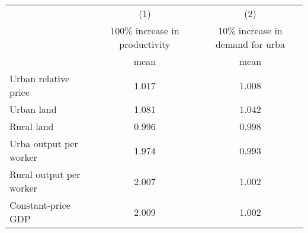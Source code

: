 {
\def\sym#1{\ifmmode^{#1}\else\(^{#1}\)\fi}
\begin{tabular}{l*{2}{c}}
\hline\hline
                    &\multicolumn{1}{c}{(1)}&\multicolumn{1}{c}{(2)}\\
                    &100\% increase in productivity&10\% increase in demand for urba\\
                    &        mean&        mean\\
\hline
Urban relative price&       1.017&       1.008\\
Urban land          &       1.081&       1.042\\
Rural land          &       0.996&       0.998\\
Urba output per worker&       1.974&       0.993\\
Rural output per worker&       2.007&       1.002\\
Constant-price GDP  &       2.009&       1.002\\
\hline\hline
\end{tabular}
}
